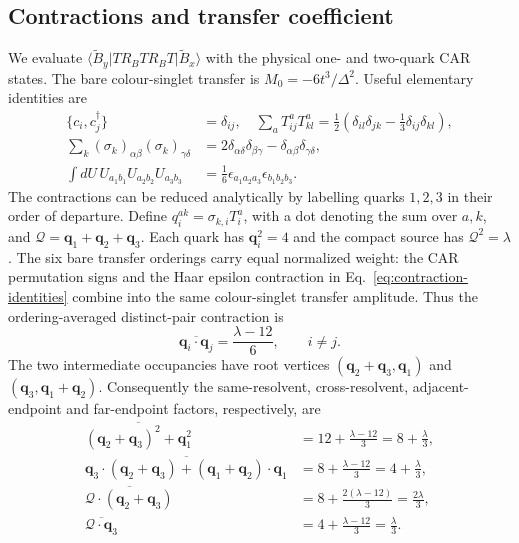 \documentclass[11pt]{article}
\newcommand{\ket}[1]{\lvert #1\rangle}
\newcommand{\bra}[1]{\langle #1\rvert}
\begin{document}
\subsection{Contractions and transfer coefficient}
We evaluate $\bra{\widetilde B_y}T R_B T R_B T\ket{\widetilde B_x}$ with the physical one- and two-quark CAR states. The bare colour-singlet transfer is $M_0=-6t^3/\Delta^2$. Useful elementary identities are
\begin{align}
 \{c_i,c_j^\dagger\}&=\delta_{ij},\quad
 \sum_aT^a_{ij}T^a_{kl}=\tfrac12(\delta_{il}\delta_{jk}-\tfrac13\delta_{ij}\delta_{kl}),\\
 \sum_k(\sigma_k)_{\alpha\beta}(\sigma_k)_{\gamma\delta}
 &=2\delta_{\alpha\delta}\delta_{\beta\gamma}-\delta_{\alpha\beta}\delta_{\gamma\delta},\\
 \int dU\,U_{a_1b_1}U_{a_2b_2}U_{a_3b_3}
 &=\frac16\epsilon_{a_1a_2a_3}\epsilon_{b_1b_2b_3}. \label{eq:contraction-identities}
\end{align}
The contractions can be reduced analytically by labelling quarks $1,2,3$ in their order of departure. Define $q_i^{ak}=\sigma_{k,i}T_i^a$, with a dot denoting the sum over $a,k$, and $\bm{\mathcal Q}=\bm q_1+\bm q_2+\bm q_3$. Each quark has $\bm q_i^2=4$ and the compact source has $\bm{\mathcal Q}^2=\lambda$. The six bare transfer orderings carry equal normalized weight: the CAR permutation signs and the Haar epsilon contraction in Eq.~\eqref{eq:contraction-identities} combine into the same colour-singlet transfer amplitude. Thus the ordering-averaged distinct-pair contraction is
\begin{equation}
 \overline{\bm q_i\cdot\bm q_j}=\frac{\lambda-12}{6},\qquad i\ne j.
\end{equation}
The two intermediate occupancies have root vertices $(\bm q_2+\bm q_3,\bm q_1)$ and $(\bm q_3,\bm q_1+\bm q_2)$. Consequently the same-resolvent, cross-resolvent, adjacent-endpoint and far-endpoint factors, respectively, are
\begin{align}
 \overline{(\bm q_2+\bm q_3)^2+\bm q_1^2}
 &=12+\frac{\lambda-12}{3}=8+\frac{\lambda}{3},\\
 \overline{\bm q_3\cdot(\bm q_2+\bm q_3)+(\bm q_1+\bm q_2)\cdot\bm q_1}
 &=8+\frac{\lambda-12}{3}=4+\frac{\lambda}{3},\\
 \overline{\bm{\mathcal Q}\cdot(\bm q_2+\bm q_3)}
 &=8+\frac{2(\lambda-12)}{3}=\frac{2\lambda}{3},\\
 \overline{\bm{\mathcal Q}\cdot\bm q_3}
 &=4+\frac{\lambda-12}{3}=\frac{\lambda}{3}.
 \label{eq:orderedcontractions}
\end{align}
\end{document}
